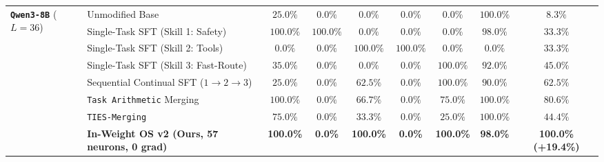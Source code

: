 \documentclass[10pt,twocolumn]{article}
\begin{document}
\begin{table}[t]
{\begin{tabular}{llccccccc}
\midrule
\multirow{8}{*}{\textbf{\texttt{Qwen3-8B}}\; ($L=36$)}
 & Unmodified Base & $25.0\%$ & $0.0\%$ & $0.0\%$ & $0.0\%$ & $0.0\%$ & $100.0\%$ & $8.3\%$ \\
 & Single-Task SFT (Skill 1: Safety) & $100.0\%$ & \textcolor{red!75!black}{$100.0\%$} & $0.0\%$ & $0.0\%$ & $0.0\%$ & $98.0\%$ & $33.3\%$ \\
 & Single-Task SFT (Skill 2: Tools) & $0.0\%$ & $0.0\%$ & $100.0\%$ & \textcolor{red!75!black}{$100.0\%$} & $0.0\%$ & \textcolor{red!75!black}{$0.0\%$} & $33.3\%$ \\
 & Single-Task SFT (Skill 3: Fast-Route) & $35.0\%$ & $0.0\%$ & $0.0\%$ & $0.0\%$ & $100.0\%$ & $92.0\%$ & $45.0\%$ \\
 & Sequential Continual SFT ($1 \to 2 \to 3$) & \textcolor{red!75!black}{$25.0\%$} & $0.0\%$ & $62.5\%$ & $0.0\%$ & $100.0\%$ & $90.0\%$ & $62.5\%$ \\
 & \texttt{Task Arithmetic} Merging \cite{ilharco2023} & $100.0\%$ & $0.0\%$ & $66.7\%$ & $0.0\%$ & $75.0\%$ & $100.0\%$ & $80.6\%$ \\
 & \texttt{TIES-Merging} \cite{yadav2023} & $75.0\%$ & $0.0\%$ & \textcolor{red!75!black}{$33.3\%$} & $0.0\%$ & \textcolor{red!75!black}{$25.0\%$} & $100.0\%$ & $44.4\%$ \\
 & \textbf{In-Weight OS v2 (Ours, 57 neurons, 0 grad)} & \textbf{100.0\%} & \textbf{0.0\%} & \textbf{100.0\%} & \textcolor{green!50!black}{\textbf{0.0\%}} & \textbf{100.0\%} & \textcolor{green!50!black}{\textbf{98.0\%}} & \textcolor{green!50!black}{\textbf{100.0\% (+19.4\%)}} \\
\bottomrule
\end{tabular}%
}
\label{tab:main_os}
\end{table}
\end{document}

